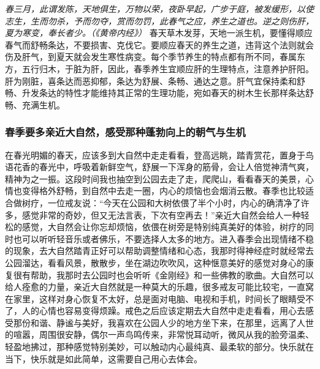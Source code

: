 \textit{春三月，此谓发陈，天地俱生，万物以荣，夜卧早起，广步于庭，被发缓形，以使志生，生而勿杀，予而勿夺，赏而勿罚，此春气之应，养生之道也。逆之则伤肝，夏为寒变，奉长者少。（《黄帝内经》）} 春天草木发芽，天地一派生机，要懂得顺应春气而舒畅条达，不要损害、克伐它。要顺应春天的养生之道，违背这个法则就会伤及肝气，到夏天就会发生寒性病变。每个季节养生的特点都有所不同，春属东方，五行归木，于脏为肝，因此，春季养生宜顺应肝的生理特点，注意养护肝阳。肝为刚脏，喜条达而恶抑郁，条达为舒展、条畅、通达之意。肝气宜保持柔和舒畅、升发条达的特性才能维持其正常的生理功能，宛如春天的树木生长那样条达舒畅、充满生机。

\subsubsection{春季要多亲近大自然，感受那种蓬勃向上的朝气与生机}

在春光明媚的春天，应该多到大自然中走走看看，登高远眺，踏青赏花，置身于鸟语花香的春光中，呼吸着新鲜空气，舒展一下浑身的筋骨，会让人倍觉神清气爽，精神为之一振。这段时间我也抽空到公园去走了走，爬爬山，看看春天的美景，心情也变得格外舒畅，到自然中去走一圈，内心的烦恼也会烟消云散。春季也比较适合做树疗，一位戒友说：“今天在公园和大树依偎了半个小时，内心的确清净了许多，感觉非常的奇妙，但又无法言表，下次有空再去！”亲近大自然会给人一种轻松的感觉，大自然会让你忘却烦恼，依偎在树旁是特别纯真美好的体验，树疗的同时也可以听听轻音乐或者佛乐，不要选择人太多的地方。进入春季会出现情绪不稳的现象，去大自然踏青正好可以帮助调整情绪和心态，我那时得神经症时就经常去公园溜达，看看风景，散散步，坐在湖边吹吹风，这种惬意美好的感觉对身心的康复很有帮助，我那时去公园时也会听听《金刚经》和一些佛教的歌曲。大自然可以给人痊愈的力量，亲近大自然就是一种莫大的乐趣，很多戒友可能比较宅，一直窝在家里，这样对身心恢复不太好，总是面对电脑、电视和手机，时间长了眼睛受不了，人的心情也容易变得烦躁。戒色之后应该定期去大自然中走走看看，用心去感受那份和谐、静谧与美好，我喜欢在公园人少的地方坐下来，在那里，远离了人世的喧嚣，周围很安静，偶尔一声鸟鸣传来，非常悦耳动听，微风从我的脸旁温柔、轻盈地拂过，那种感觉特别美妙，可以触动内心最纯真、最柔软的部分。快乐就在当下，快乐就是如此简单，这需要自己用心去体会。

